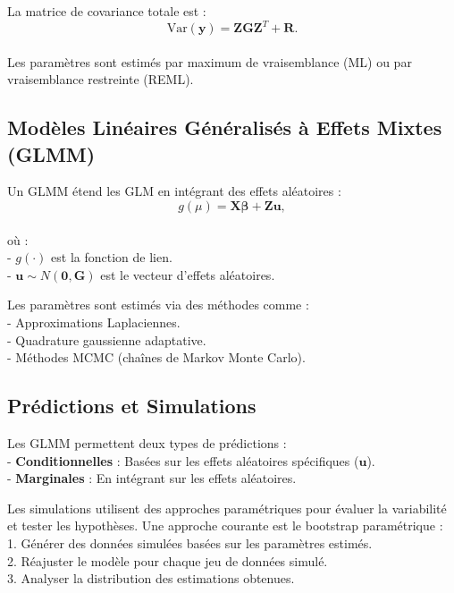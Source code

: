 \documentclass[
]{article}
\begin{document}
La matrice de covariance totale est :\\
\[ \mathrm{Var}(\mathbf{y}) = \mathbf{Z} \mathbf{G} \mathbf{Z}^T + \mathbf{R}. \]\\
Les paramètres sont estimés par maximum de vraisemblance (ML) ou par
vraisemblance restreinte (REML).

\subsection{Modèles Linéaires Généralisés à Effets Mixtes
(GLMM)}\label{moduxe8les-linuxe9aires-guxe9nuxe9ralisuxe9s-uxe0-effets-mixtes-glmm}

Un GLMM étend les GLM en intégrant des effets aléatoires :\\
\[ g(\mu) = \mathbf{X} \boldsymbol{\beta} + \mathbf{Z} \mathbf{u}, \]\\
où :\\
- \(g(\cdot)\) est la fonction de lien.\\
- \(\mathbf{u} \sim N(\mathbf{0}, \mathbf{G})\) est le vecteur d'effets
aléatoires.

Les paramètres sont estimés via des méthodes comme :\\
- Approximations Laplaciennes.\\
- Quadrature gaussienne adaptative.\\
- Méthodes MCMC (chaînes de Markov Monte Carlo).

\subsection{Prédictions et
Simulations}\label{pruxe9dictions-et-simulations}

Les GLMM permettent deux types de prédictions :\\
- \textbf{Conditionnelles} : Basées sur les effets aléatoires
spécifiques (\(\mathbf{u}\)).\\
- \textbf{Marginales} : En intégrant sur les effets aléatoires.

Les simulations utilisent des approches paramétriques pour évaluer la
variabilité et tester les hypothèses. Une approche courante est le
bootstrap paramétrique :\\
1. Générer des données simulées basées sur les paramètres estimés.\\
2. Réajuster le modèle pour chaque jeu de données simulé.\\
3. Analyser la distribution des estimations obtenues.
\end{document}
